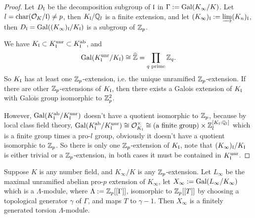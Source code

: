 \begin{proof}
Let $D_{\mathfrak{l}}$ be the decomposition subgroup of ${\mathfrak{l}}$ in $\Gamma:={\mathrm{Gal}}(K_\infty/K)$.
Let $l=\operatorname{char}({\mathcal {O}}_K/{\mathfrak{l}})\neq p$, then $K_{\mathfrak{l}}/{\mathbb {Q}}_l$ is a finite extension,
and let $(K_\infty)_{\mathfrak{l}}:=\varinjlim(K_n)_{\mathfrak{l}}$, then
$D_{\mathfrak{l}}={\mathrm{Gal}}((K_\infty)_{\mathfrak{l}}/K_{\mathfrak{l}})$ is a subgroup of ${\mathbb {Z}}_p$.

We have $K_{\mathfrak{l}}\subset K_{\mathfrak{l}}^{\mathrm{unr}}\subset K_{\mathfrak{l}}^{\mathrm{ab}}$,
and
$$
{\mathrm{Gal}}(K_{\mathfrak{l}}^{\mathrm{unr}}/K_{\mathfrak{l}})\cong\widehat{{\mathbb {Z}}}
=\prod_{q\text{ prime}}{\mathbb {Z}}_q.
$$
So $K_{\mathfrak{l}}$ has at least one ${\mathbb {Z}}_p$-extension, i.e. the unique unramified
${\mathbb {Z}}_p$-extension. If there are other ${\mathbb {Z}}_p$-extensions of $K_{\mathfrak{l}}$,
then there exists a Galois extension of $K_{\mathfrak{l}}$ with Galois group
isomorphic to ${\mathbb {Z}}_p^2$.

However, ${\mathrm{Gal}}(K_{\mathfrak{l}}^{\mathrm{ab}}/K_{\mathfrak{l}}^{\mathrm{unr}})$
doesn't have a quotient isomorphic to ${\mathbb {Z}}_p$, because by
local class field theory,
${\mathrm{Gal}}(K_{\mathfrak{l}}^{\mathrm{ab}}/K_{\mathfrak{l}}^{\mathrm{unr}})\cong{\mathcal {O}}_{K_{\mathfrak{l}}}^\times\cong
(\text{a finite group})\times{\mathbb {Z}}_l^{[K_{\mathfrak{l}}:{\mathbb {Q}}_l]}$ which is a finite group
times a pro-$l$ group, obviously it doesn't have a quotient isomorphic to ${\mathbb {Z}}_p$.
So there is only one ${\mathbb {Z}}_p$-extension of $K_{\mathfrak{l}}$,
note that $(K_\infty)_{\mathfrak{l}}/K_{\mathfrak{l}}$ is either trivial or a ${\mathbb {Z}}_p$-extension,
in both cases it must be contained in $K_{\mathfrak{l}}^{\mathrm{unr}}$.
\end{proof}

\begin{thm}[Iwasawa]\label{p:f-g-torsion2}
Suppose $K$ is any number field, and $K_\infty/K$ is any ${\mathbb {Z}}_p$-extension.
Let $L_\infty$ be the maximal unramified abelian pro-$p$ extension of $K_\infty$,
let $X_\infty:={\mathrm{Gal}}(L_\infty/K_\infty)$ which is a $\Lambda$-module,
where $\Lambda:={\mathbb {Z}}_p[[\Gamma]]$, isomorphic to ${\mathbb {Z}}_p[[T]]$
by choosing a topological generator $\gamma$ of $\Gamma$,
and maps $T$ to $\gamma-1$. Then $X_\infty$ is a finitely generated torsion
$\Lambda$-module.
\end{thm}

